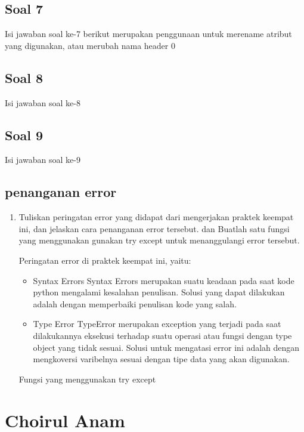 \subsection{Soal 7}
Isi jawaban soal ke-7
 berikut merupakan penggunaan untuk merename atribut yang digunakan, atau merubah nama header 0
    
\subsection{Soal 8}
Isi jawaban soal ke-8
  
\subsection{Soal 9}
Isi jawaban soal ke-9
 
\subsection{penanganan error}
\begin{enumerate}
	\item Tuliskan  peringatan  error  yang  didapat  dari  mengerjakan  praktek  keempat  ini, dan  jelaskan  cara  penanganan  error  tersebut.   dan  Buatlah  satu  fungsi  yang menggunakan gunakan try except untuk menanggulangi error tersebut.
	
	Peringatan error di praktek keempat ini, yaitu:
	\begin{itemize}
		\item Syntax Errors
		Syntax Errors merupakan suatu keadaan pada saat kode python mengalami kesalahan penulisan. Solusi yang dapat dilakukan adalah dengan memperbaiki penulisan kode yang salah.
		
		\item Type Error
		TypeError merupakan exception yang terjadi pada saat dilakukannya eksekusi terhadap suatu operasi atau fungsi dengan type object yang tidak sesuai. Solusi untuk mengatasi error ini adalah dengan mengkoversi varibelnya sesuai dengan tipe data yang akan digunakan.
	\end{itemize}
Fungsi yang menggunakan try except
	
\end{enumerate}

\section{Choirul Anam}
